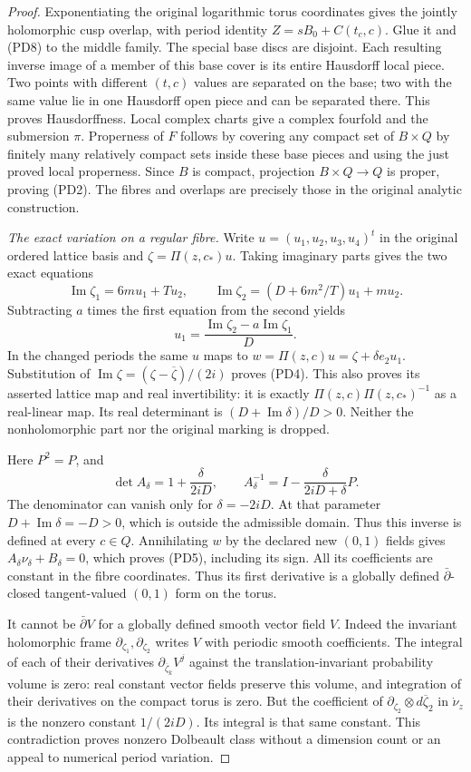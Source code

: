\begin{proof}
Exponentiating the original logarithmic torus coordinates gives the
jointly holomorphic cusp overlap, with period identity
$Z=sB_0+C(t_c,c)$. Glue it and (PD8) to the middle family.
The special base discs are disjoint. Each resulting inverse image of
a member of this base cover is its entire Hausdorff local piece.
Two points with different $(t,c)$ values are separated on the base;
two with the same value lie in one Hausdorff open piece and can be
separated there. This proves Hausdorffness. Local complex charts give
a complex fourfold and the submersion $\pi$.
Properness of $F$ follows by covering any compact set of $B\times Q$
by finitely many relatively compact sets inside these base pieces and
using the just proved local properness. Since $B$ is compact, projection
$B\times Q\to Q$ is proper, proving (PD2). The fibres and overlaps
are precisely those in the original analytic construction.

\emph{The exact variation on a regular fibre.}
Write $u=(u_1,u_2,u_3,u_4)^t$ in the original ordered lattice basis and
$\zeta=\Pi(z,c_*)u$. Taking imaginary parts gives the two exact equations
\[
 \operatorname{Im}\zeta_1=6m u_1+T u_2,\qquad
 \operatorname{Im}\zeta_2=(D+6m^2/T)u_1+m u_2.
 \tag{PD13}
\]
Subtracting $a$ times the first equation from the second yields
\[
 u_1=\frac{\operatorname{Im}\zeta_2-a\operatorname{Im}\zeta_1}{D}.
 \tag{PD14}
\]
In the changed periods the same $u$ maps to
$w=\Pi(z,c)u=\zeta+\delta e_2u_1$. Substitution of
$\operatorname{Im}\zeta=(\zeta-\overline\zeta)/(2i)$ proves (PD4).
This also proves its asserted lattice map and real invertibility:
it is exactly $\Pi(z,c)\Pi(z,c_*)^{-1}$ as a real-linear map.
Its real determinant is $(D+\operatorname{Im}\delta)/D>0$.
Neither the nonholomorphic part nor the original marking is dropped.

Here $P^2=P$, and
\[
 \det A_\delta=1+\frac\delta{2iD},\qquad
 A_\delta^{-1}=I-\frac{\delta}{2iD+\delta}P.
 \tag{PD15}
\]
The denominator can vanish only for $\delta=-2iD$. At that parameter
$D+\operatorname{Im}\delta=-D>0$, which is outside the admissible
domain. Thus this inverse is defined at every $c\in Q$.
Annihilating $w$ by the declared new $(0,1)$ fields gives
$A_\delta\nu_\delta+B_\delta=0$, which proves (PD5), including
its sign. All its coefficients are constant in the fibre coordinates.
Thus its first derivative is a globally defined $\bar\partial$-closed
tangent-valued $(0,1)$ form on the torus.

It cannot be $\bar\partial V$ for a globally defined smooth vector
field $V$. Indeed the invariant holomorphic frame
$\partial_{\zeta_1},\partial_{\zeta_2}$ writes $V$ with periodic
smooth coefficients. The integral of each of their derivatives
$\partial_{\overline\zeta_k}V^j$ against the translation-invariant
probability volume is zero: real constant vector fields preserve this
volume, and integration of their derivatives on the compact torus is
zero. But the coefficient of
$\partial_{\zeta_2}\otimes d\overline\zeta_2$ in $\dot\nu_z$ is
the nonzero constant $1/(2iD)$. Its integral is that same constant.
This contradiction proves nonzero Dolbeault class without a dimension
count or an appeal to numerical period variation.


\end{proof}
